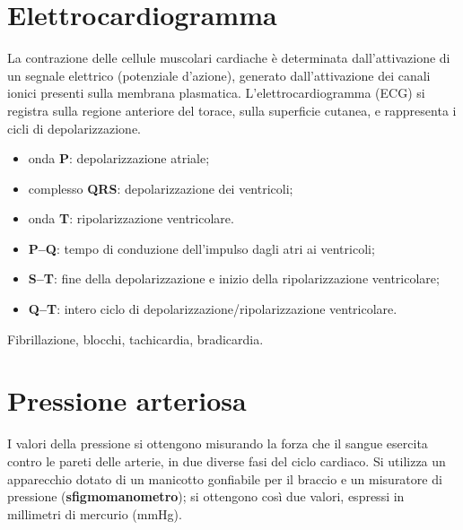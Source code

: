 \section{Elettrocardiogramma}

La contrazione delle cellule muscolari cardiache è determinata dall'attivazione di un segnale
elettrico (potenziale d'azione), generato dall'attivazione dei canali ionici presenti sulla
membrana plasmatica. L'elettrocardiogramma (ECG) si registra sulla regione anteriore del torace,
sulla superficie cutanea, e rappresenta i cicli di depolarizzazione.

\begin{itemize}
  \item onda \textbf{P}: depolarizzazione atriale;
  \item complesso \textbf{QRS}: depolarizzazione dei ventricoli;
  \item onda \textbf{T}: ripolarizzazione ventricolare.
\end{itemize}

\begin{itemize}
  \item \textbf{P--Q}: tempo di conduzione dell'impulso dagli atri ai ventricoli;
  \item \textbf{S--T}: fine della depolarizzazione e inizio della ripolarizzazione ventricolare;
  \item \textbf{Q--T}: intero ciclo di depolarizzazione/ripolarizzazione ventricolare.
\end{itemize}

Fibrillazione, blocchi, tachicardia, bradicardia.

\section{Pressione arteriosa}

I valori della pressione si ottengono misurando la forza che il sangue esercita contro le pareti
delle arterie, in due diverse fasi del ciclo cardiaco. Si utilizza un apparecchio dotato di un
manicotto gonfiabile per il braccio e un misuratore di pressione (\textbf{sfigmomanometro}); si
ottengono così due valori, espressi in millimetri di mercurio (mmHg).

